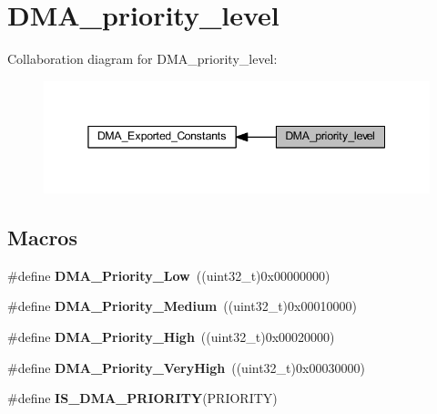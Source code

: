 \hypertarget{group___d_m_a__priority__level}{}\section{D\+M\+A\+\_\+priority\+\_\+level}
\label{group___d_m_a__priority__level}
Collaboration diagram for D\+M\+A\+\_\+priority\+\_\+level\+:\nopagebreak
\begin{figure}[H]
\begin{center}
\leavevmode
\includegraphics[width=345pt]{group___d_m_a__priority__level}
\end{center}
\end{figure}
\subsection*{Macros}
\begin{DoxyCompactItemize}
\item 
\mbox{\label{group___d_m_a__priority__level_gaf414e0aa8dd42aee6f83f88ab6175179}} 
\#define {\bfseries D\+M\+A\+\_\+\+Priority\+\_\+\+Low}~((uint32\+\_\+t)0x00000000)
\item 
\mbox{\label{group___d_m_a__priority__level_ga8e0d4a958f4288c6c759945789490f38}} 
\#define {\bfseries D\+M\+A\+\_\+\+Priority\+\_\+\+Medium}~((uint32\+\_\+t)0x00010000)
\item 
\mbox{\label{group___d_m_a__priority__level_gae2441c0b4d4ba9945a6f4f7d08045a8e}} 
\#define {\bfseries D\+M\+A\+\_\+\+Priority\+\_\+\+High}~((uint32\+\_\+t)0x00020000)
\item 
\mbox{\label{group___d_m_a__priority__level_gadccd2f8b2ac24ba4fd485dd5b9b48671}} 
\#define {\bfseries D\+M\+A\+\_\+\+Priority\+\_\+\+Very\+High}~((uint32\+\_\+t)0x00030000)
\item 
\#define {\bfseries I\+S\+\_\+\+D\+M\+A\+\_\+\+P\+R\+I\+O\+R\+I\+TY}(P\+R\+I\+O\+R\+I\+TY)
\end{DoxyCompactItemize}


